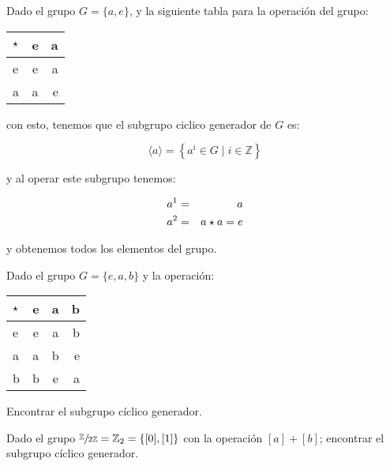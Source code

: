         \begin{ejemplo}
            Dado el grupo $G = \{a, e\}$, y la siguiente tabla para la operación del grupo:

            \begin{center}
                \begin{tabular}{l | c r}
                    $\star$ & e & a \\
                    \hline
                    e & e & a \\
                    a & a & e
                \end{tabular}
            \end{center}

            con esto, tenemos que el subgrupo ciclico generador de $G$ es:

            \begin{equation*}
                \langle a \rangle = \left\{ a^i \in G \mid i \in \mathbb{Z} \right\}
            \end{equation*}

            y al operar este subgrupo tenemos:

            \begin{eqnarray*}
                a^1 & = & a  \\
                a^2 & = & a \star a = e
            \end{eqnarray*}

            y obtenemos todos los elementos del grupo.
        \end{ejemplo}

        \begin{ejercicio}
            Dado el grupo $G = \{e, a, b\}$ y la operación:

            \begin{center}
                \begin{tabular}{l | c c r}
                    $\star$ & e & a & b \\
                    \hline
                    e & e & a & b \\
                    a & a & b & e \\
                    b & b & e & a
                \end{tabular}
            \end{center}

            Encontrar el subgrupo cíclico generador.
        \end{ejercicio}

        \begin{ejercicio}
            Dado el grupo $\sfrac{\mathbb{Z}}{2\mathbb{Z}} = \mathbb{Z}_2 = \left\{ [0], [1] \right\}$ con la operación $[a] + [b]$; encontrar el subgrupo cíclico generador.
        \end{ejercicio}

